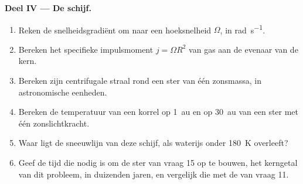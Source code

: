 \begin{problem}
\noindent\textbf{Deel IV --- De schijf.}
\begin{enumerate}[resume]
  \item Reken de snelheidsgradiënt om naar een hoeksnelheid $\Omega$, in
        \unit{rad.s^{-1}}.
  \item Bereken het specifieke impulsmoment $j = \Omega R^2$ van gas aan de
        evenaar van de kern.
  \item Bereken zijn centrifugale straal rond een ster van één zonsmassa, in
        astronomische eenheden.
  \item Bereken de temperatuur van een korrel op \qty{1}{au} en op \qty{30}{au}
        van een ster met één zonslichtkracht.
  \item Waar ligt de sneeuwlijn van deze schijf, als waterijs onder
        \qty{180}{K} overleeft?
  \item Geef de tijd die nodig is om de ster van vraag 15 op te bouwen, het kerngetal
        van dit probleem, in duizenden jaren, en vergelijk die met de
         van vraag 11.
\end{enumerate}
\end{problem}
